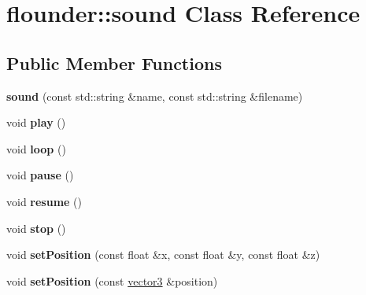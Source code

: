 \hypertarget{classflounder_1_1sound}{}\section{flounder\+:\+:sound Class Reference}
\label{classflounder_1_1sound}
\subsection*{Public Member Functions}
\begin{DoxyCompactItemize}
\item 
\mbox{\label{classflounder_1_1sound_abbeeafc7017bc46ae690185645951b43}} 
{\bfseries sound} (const std\+::string \&name, const std\+::string \&filename)
\item 
\mbox{\label{classflounder_1_1sound_a83ea32b1c895fb82f7c5323cee0cf2c0}} 
void {\bfseries play} ()
\item 
\mbox{\label{classflounder_1_1sound_a47e20e1fa3789aaf8c0d6dbb7bacff20}} 
void {\bfseries loop} ()
\item 
\mbox{\label{classflounder_1_1sound_aaef650198f17781436531f69804bbc6a}} 
void {\bfseries pause} ()
\item 
\mbox{\label{classflounder_1_1sound_a009945f09a96a6cb6040ca47b84dc42a}} 
void {\bfseries resume} ()
\item 
\mbox{\label{classflounder_1_1sound_ab1c87d2ac4b2bcfbd7c278fd5a19c39a}} 
void {\bfseries stop} ()
\item 
\mbox{\label{classflounder_1_1sound_ab5a61d5a01dfebd1110b931eed9a4c6a}} 
void {\bfseries set\+Position} (const float \&x, const float \&y, const float \&z)
\item 
\mbox{\label{classflounder_1_1sound_a7b0338eb4812a533b42ebaa7e571dd45}} 
void {\bfseries set\+Position} (const \hyperlink{classflounder_1_1vector3}{vector3} \&position)
\item 
\mbox{\label{classflounder_1_1sound_a5d476a4f4dc13793b85aaeaa52296e68}} 

\end{DoxyCompactItemize}
